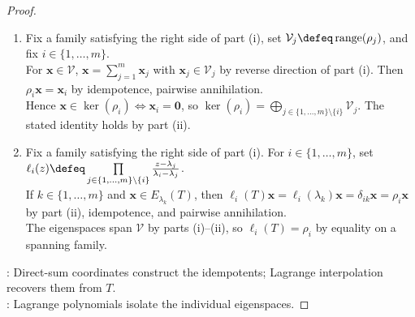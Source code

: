 \begin{theorem}
\begin{proof}
\begin{enumerate}[label=(\roman*)]
Then $(\forall j\in\{1,\ldots,m\}\setminus\{i\})\,\mathbf{x}_j=\mathbf{0}$ by directness of $\sum\limits_{j=1}^{m}(\lambda_j-\lambda_i)\mathbf{x}_j=\mathbf{0}$ and distinctness.\\
Hence $\mathbf{x}=\mathbf{x}_i\in\mathcal{V}_i$, and $\mathcal{V}_i=E_{\lambda_i}(T)$ by the two inclusions.
\item[$(iii)$] Fix a family satisfying the right side of part (i), set $\mathcal{V}_j\defeq\operatorname{range}(\rho_j)$, and fix $i\in\{1,\ldots,m\}$.\\
For $\mathbf{x}\in\mathcal{V}$, $\mathbf{x}=\sum\limits_{j=1}^{m}\mathbf{x}_j$ with $\mathbf{x}_j\in\mathcal{V}_j$ by reverse direction of part (i). Then $\rho_i\mathbf{x}=\mathbf{x}_i$ by idempotence, pairwise annihilation.\\
Hence $\mathbf{x}\in\ker(\rho_i)\Longleftrightarrow\mathbf{x}_i=\mathbf{0}$, so $\ker(\rho_i)=\bigoplus\limits_{j\in\{1,\ldots,m\}\setminus\{i\}}\mathcal{V}_j$. The stated identity holds by part (ii).
\item[$(iv)$] Fix a family satisfying the right side of part (i). For $i\in\{1,\ldots,m\}$, set $\ell_i(z)\defeq\prod\limits_{j\in\{1,\ldots,m\}\setminus\{i\}}\frac{z-\lambda_j}{\lambda_i-\lambda_j}$.\\
If $k\in\{1,\ldots,m\}$ and $\mathbf{x}\in E_{\lambda_k}(T)$, then $\ell_i(T)\mathbf{x}=\ell_i(\lambda_k)\mathbf{x}=\delta_{ik}\mathbf{x}=\rho_i\mathbf{x}$ by part (ii), idempotence, and pairwise annihilation.\\
The eigenspaces span $\mathcal{V}$ by parts (i)--(ii), so $\ell_i(T)=\rho_i$ by equality on a spanning family.
\end{enumerate}
: Direct-sum coordinates construct the idempotents; Lagrange interpolation recovers them from $T$.\\
: Lagrange polynomials isolate the individual eigenspaces.
\end{proof}
\end{theorem}

